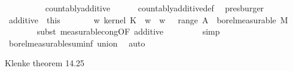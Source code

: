 \begin{isabellebody}
\ \ \ \ \ \ \ \ \isamarkupfalse%
\ countably{\isacharunderscore}{\kern0pt}additive\ {}\ {}\ {}\ {}\ \isamarkupfalse%
\ countably{\isacharunderscore}{\kern0pt}additive{\isacharunderscore}{\kern0pt}def\ \isamarkupfalse%
\ presburger\isanewline
\ \ \ \ \isacommand{{\isacharbraceright}{\kern0pt}}\isamarkupfalse%
\ \isamarkupfalse%
\ additive\ {\isacharequal}{\kern0pt}\ this\isanewline
\ \ \ \ \isamarkupfalse%
\ \isamarkupfalse%
\ {\isachardoublequoteopen}{\isacharparenleft}{\kern0pt}{\isasymlambda}w{\isachardot}{\kern0pt}\ kernel\ K\ {\isacharparenleft}{\kern0pt}{\isasymomega}\ w{\isacharparenright}{\kern0pt}\ {\isacharbraceleft}{\kern0pt}{\isasymomega}\ {\isacharparenleft}{\kern0pt}w{\isacharcomma}{\kern0pt}\ {\isasymomega}\ {\isasymin}\ {\isasymUnion}{\isacharparenleft}{\kern0pt}range\ A{\isacharparenright}{\kern0pt}{\isacharbraceright}{\kern0pt}{\isacharparenright}{\kern0pt}\ {\isasymin}\ borel{\isacharunderscore}{\kern0pt}measurable\ M{}{\isachardoublequoteclose}\isanewline
\ \ \ \ \ \ \isamarkupfalse%
\ {\isacharparenleft}{\kern0pt}subst\ measurable{\isacharunderscore}{\kern0pt}cong{\isacharbrackleft}{\kern0pt}OF\ additive{\isacharbrackright}{\kern0pt}{\isacharparenright}{\kern0pt}\isanewline
\ \ \ \ \ \ \ \isamarkupfalse%
\ simp\isanewline
\ \ \ \ \ \ \isamarkupfalse%
\ borel{\isacharunderscore}{\kern0pt}measurable{\isacharunderscore}{\kern0pt}suminf\ union\ \isamarkupfalse%
\ auto\isanewline
\ \ \isamarkupfalse%
\isanewline
{}\isamarkupfalse%
%
\endisatagproof
{\isafoldproof}%
%
\isadelimproof
%
\endisadelimproof
%
\begin{isamarkuptext}%
Klenke theorem 14.25%
\end{isamarkuptext}\isamarkuptrue%
%
\end{isabellebody}
